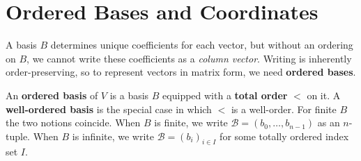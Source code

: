 
\newpage
\section{Ordered Bases and Coordinates}

\begin{remark}[Motivation]
    A basis $B$ determines unique coefficients for each vector, but without an ordering
    on $B$, we cannot write these coefficients as a \emph{column vector}. Writing is inherently
    order-preserving, so to represent vectors in matrix form, we need \textbf{ordered bases}.
\end{remark}

\begin{definition}\label{def:ordered-basis}
    An \textbf{ordered basis} of $V$ is a basis $B$ equipped with a \textbf{total order} $<$ on it.
    A \textbf{well-ordered basis} is the special case in which $<$ is a well-order. For finite
    $B$ the two notions coincide.
    When $B$ is finite, we write $\mathcal{B} = (b_0, \ldots, b_{n-1})$ as an $n$-tuple.
    When $B$ is infinite, we write $\mathcal{B} = (b_i)_{i \in I}$ for some totally ordered index set $I$.
\end{definition}

